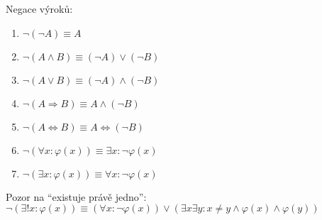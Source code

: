 Negace výroků:
\begin{multicols}{2}
\begin{enumerate}
	\item  $\neg (\neg A) \equiv A$
	\item  $\neg (A \wedge B) \equiv (\neg A) \vee (\neg B)$
	\item  $\neg (A \vee B) \equiv (\neg A) \wedge (\neg B)$
	\item  $\neg (A \Rightarrow B) \equiv A \wedge (\neg B)$
	\item  $\neg (A \Leftrightarrow B) \equiv A \Leftrightarrow (\neg B)$
	\item  $\neg \left( \forall x \colon \varphi(x) \right) \equiv \exists x \colon \neg \varphi(x)$
	\item  $\neg \left( \exists x \colon \varphi(x) \right) \equiv \forall x \colon \neg \varphi(x)$
\end{enumerate}
\end{multicols}
Pozor na ``existuje právě jedno'': $\neg \left( \exists! x \colon \varphi(x) \right) \equiv \left( \forall x \colon \neg \varphi(x) \right) \vee \left( \exists x \exists y \colon x \neq y \wedge \varphi(x) \wedge \varphi(y) \right)$

